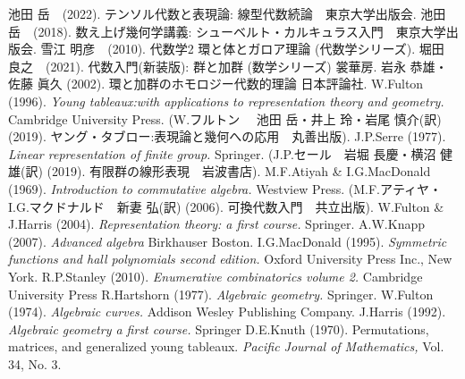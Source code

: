 \begin{thebibliography}{99}
  
   池田 岳　(2022). テンソル代数と表現論: 線型代数続論　東京大学出版会.
   池田 岳　(2018). 数え上げ幾何学講義: シューベルト・カルキュラス入門　東京大学出版会.
   雪江 明彦　(2010). 代数学2 環と体とガロア理論 (代数学シリーズ).
   堀田 良之　(2021). 代数入門(新装版): 群と加群 (数学シリーズ) 裳華房.
   岩永 恭雄・佐藤 眞久 (2002). 環と加群のホモロジー代数的理論 日本評論社.
   W.Fulton (1996). \textit{Young tableaux:with applications to representation theory and geometry.} Cambridge University Press. (W.フルトン　 池田 岳・井上 玲・岩尾 慎介(訳) (2019). ヤング・タブロー:表現論と幾何への応用　丸善出版).
   J.P.Serre (1977). \textit{Linear representation of finite group.} Springer. (J.P.セール　岩堀 長慶・横沼 健雄(訳) (2019). 有限群の線形表現　岩波書店).
   M.F.Atiyah & I.G.MacDonald (1969). \textit{Introduction to commutative algebra.} Westview Press. (M.F.アティヤ・I.G.マクドナルド　新妻 弘(訳) (2006). 可換代数入門　共立出版).
   W.Fulton & J.Harris (2004). \textit{Representation theory: a first course.} Springer. 
  A.W.Knapp (2007). \textit{Advanced algebra} Birkhauser Boston.
   I.G.MacDonald (1995). \textit{Symmetric functions and hall polynomials second edition.}  Oxford University Press Inc., New York.
   R.P.Stanley (2010). \textit{Enumerative combinatorics volume 2.} Cambridge University Press
   R.Hartshorn (1977). \textit{Algebraic geometry.} Springer.
   W.Fulton (1974). \textit{Algebraic curves.} Addison Wesley Publishing Company. 
   J.Harris (1992). \textit{Algebraic geometry a first course.} Springer
   D.E.Knuth (1970). Permutations, matrices, and generalized young tableaux. \textit{Pacific Journal of Mathematics, }Vol. 34, No. 3.
\end{thebibliography}